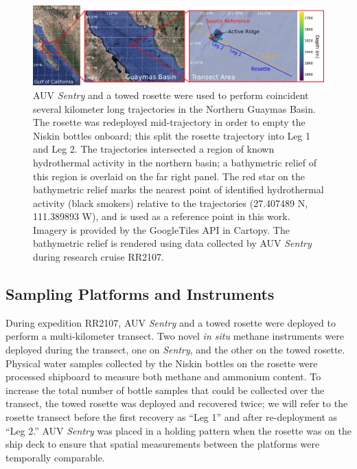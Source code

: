 \begin{figure}[h!]
    \begin{center}
    \includegraphics[width=\columnwidth]{figures/chap3_transect_overview.jpg}
    \end{center}
    \caption{AUV \emph{Sentry} and a towed rosette were used to perform coincident several kilometer long trajectories in the Northern Guaymas Basin. The rosette was redeployed mid-trajectory in order to empty the Niskin bottles onboard; this split the rosette trajectory into Leg 1 and Leg 2. The trajectories intersected a region of known hydrothermal activity in the northern basin; a bathymetric relief of this region is overlaid on the far right panel. The red star on the bathymetric relief marks the nearest point of identified hydrothermal activity (black smokers) relative to the trajectories (27.407489 N, 111.389893 W), and is used as a reference point in this work. Imagery is provided by the GoogleTiles API in Cartopy. The bathymetric relief is rendered using data collected by AUV \emph{Sentry} during research cruise RR2107.}
    \label{fig:bathy}
    \end{figure}


\subsection{Sampling Platforms and Instruments}
During expedition RR2107, AUV \emph{Sentry} and a towed rosette were deployed to perform a multi-kilometer transect. Two novel \emph{in situ} methane instruments were deployed during the transect, one on \emph{Sentry}, and the other on the towed rosette. Physical water samples collected by the Niskin bottles on the rosette were processed shipboard to measure both methane and ammonium content. To increase the total number of bottle samples that could be collected over the transect, the towed rosette was deployed and recovered twice; we will refer to the rosette transect before the first recovery as ``Leg 1'' and after re-deployment as ``Leg 2.'' AUV \emph{Sentry} was placed in a holding pattern when the rosette was on the ship deck to ensure that spatial measurements between the platforms were temporally comparable.

